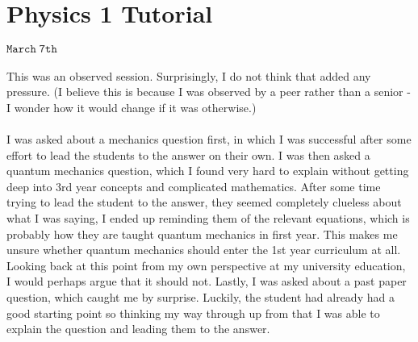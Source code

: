 \section{Physics 1 Tutorial}
\begin{flushright}
$\mathtt{March \; 7th}$
\end{flushright}

\paragraph{}
This was an observed session. Surprisingly, I do not think that added any pressure. (I believe this is because I was observed by a peer rather than a senior - I wonder how it would change if it was otherwise.)

\paragraph{}
I was asked about a mechanics question first, in which I was successful after some effort to lead the students to the answer on their own. I was then asked a quantum mechanics question, which I found very hard to explain without getting deep into 3rd year concepts and complicated mathematics. After some time trying to lead the student to the answer, they seemed completely clueless about what I was saying, I ended up reminding them of the relevant equations, which is probably how they are taught quantum mechanics in first year. This makes me unsure whether quantum mechanics should enter the 1st year curriculum at all. Looking back at this point from my own perspective at my university education, I would perhaps argue that it should not. Lastly, I was asked about a past paper question, which caught me by surprise. Luckily, the student had already had a good starting point so thinking my way through up from that I was able to explain the question and leading them to the answer.
  
